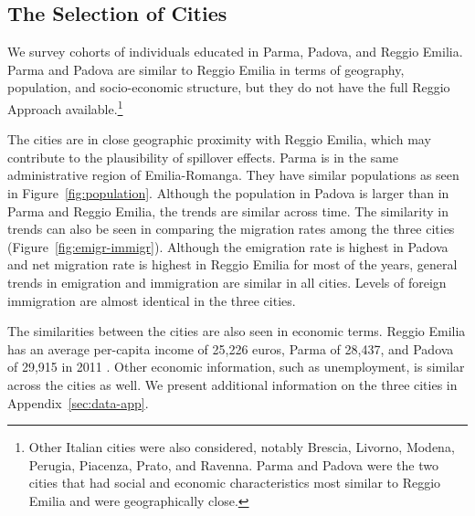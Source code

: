 \subsection{The Selection of Cities}

We survey cohorts of individuals educated in Parma, Padova, and Reggio Emilia. Parma and Padova are similar to Reggio Emilia in terms of geography, population, and socio-economic structure, but they do not have the full Reggio Approach available.\footnote{Other Italian cities were also considered, notably Brescia, Livorno, Modena, Perugia, Piacenza, Prato, and Ravenna. Parma and Padova were the two cities that had social and economic characteristics most similar to Reggio Emilia and were geographically close.}

The cities are in close geographic proximity with Reggio Emilia, which may contribute to the plausibility of spillover effects. Parma is in the same administrative region of Emilia-Romanga. They have similar populations as seen in Figure~\ref{fig:population}. Although the population in Padova is larger than in Parma and Reggio Emilia, the trends are similar across time. The similarity in trends can also be seen in comparing the migration rates among the three cities (Figure~\ref{fig:emigr-immigr}). Although the emigration rate is highest in Padova and net migration rate is highest in Reggio Emilia for most of the years, general trends in emigration and immigration are similar in all cities. Levels of foreign immigration are almost identical in the three cities.

The similarities between the cities are also seen in economic terms. Reggio Emilia has an average per-capita income of 25,226 euros, Parma of 28,437, and Padova of 29,915 in 2011 \citep{Comuni-Italiani_2017_Redditi-Ipref-per-Regione-2011}. Other economic information, such as unemployment, is similar across the cities as well. We present additional information on the three cities in Appendix~\ref{sec:data-app}.


